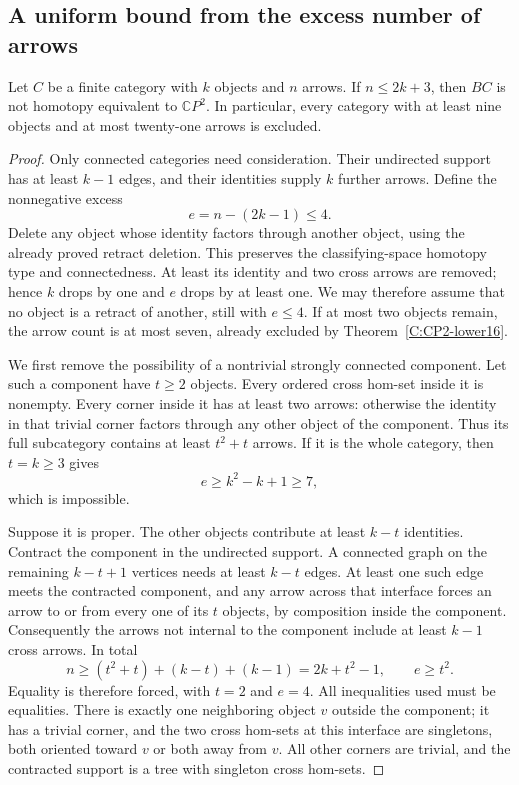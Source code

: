 \subsection{A uniform bound from the excess number of arrows}

\begin{theorem}\label{C:arrow-excess-four}
Let $C$ be a finite category with $k$ objects and $n$ arrows.
If $n\leq2k+3$, then $BC$ is not homotopy equivalent to
$\mathbb CP^2$.
In particular, every category with at least nine objects and
at most twenty-one arrows is excluded.
\end{theorem}
\begin{proof}
Only connected categories need consideration.  Their
undirected support has at least $k-1$ edges, and their
identities supply $k$ further arrows.  Define the nonnegative
excess
\[
 e=n-(2k-1)\leq4.
\]
Delete any object whose identity factors through another
object, using the already proved retract deletion.  This
preserves the classifying-space homotopy type and
connectedness.  At least its identity and two cross arrows
are removed; hence $k$ drops by one and $e$ drops by at
least one.  We may therefore assume that no object is a
retract of another, still with $e\leq4$.
If at most two objects remain, the arrow count is at most
seven, already excluded by Theorem~\ref{C:CP2-lower16}.

We first remove the possibility of a nontrivial strongly
connected component.  Let such a component have $t\geq2$
objects.  Every ordered cross hom-set inside it is nonempty.
Every corner inside it has at least two arrows: otherwise
the identity in that trivial corner factors through any
other object of the component.  Thus its full subcategory
contains at least $t^2+t$ arrows.  If it is the whole category,
then $t=k\geq3$ gives
\[
 e\geq k^2-k+1\geq7,
\]
which is impossible.

Suppose it is proper.  The other objects contribute at least
$k-t$ identities.  Contract the component in the undirected
support.  A connected graph on the remaining $k-t+1$
vertices needs at least $k-t$ edges.  At least one such edge
meets the contracted component, and any arrow across that
interface forces an arrow to or from every one of its $t$
objects, by composition inside the component.  Consequently
the arrows not internal to the component include at least
$k-1$ cross arrows.  In total
\[
 n\geq(t^2+t)+(k-t)+(k-1)=2k+t^2-1,
 \qquad e\geq t^2.
\]
Equality is therefore forced, with $t=2$ and $e=4$.
All inequalities used must be equalities.  There is exactly
one neighboring object $v$ outside the component; it has a
trivial corner, and the two cross hom-sets at this interface
are singletons, both oriented toward $v$ or both away from
$v$.  All other corners are trivial, and the contracted
support is a tree with singleton cross hom-sets.


\end{proof}
